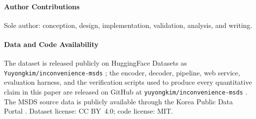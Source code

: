 \documentclass[smallextended]{svjour3}
\begin{document}
\paragraph{Author Contributions}
Sole author: conception, design, implementation, validation, analysis, and writing.

\paragraph{Data and Code Availability}
The dataset is released publicly on HuggingFace Datasets as \texttt{Yuyongkim/inconvenience-msds} \cite{hf_dataset}; the encoder, decoder, pipeline, web service, evaluation harness, and the verification scripts used to produce every quantitative claim in this paper are released on GitHub at \texttt{yuyongkim/inconvenience-msds} \cite{github_repo}. The MSDS source data is publicly available through the Korea Public Data Portal \cite{data_go_kr}. Dataset license: CC BY~4.0; code license: MIT.



\end{document}
